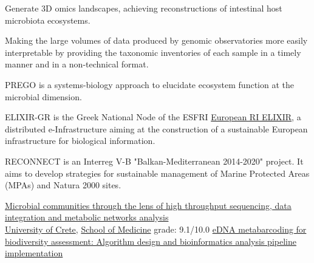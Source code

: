 \documentclass[
    a4paper,
]{fortysecondscv}
\begin{document}
\makefrontsidebar

\begin{cvtable}[3]

    {Generate 3D omics landscapes, achieving reconstructions of intestinal host microbiota ecosystems.}

    {Making the large volumes of data produced by genomic observatories more easily interpretable by providing the taxonomic inventories of each sample in a timely manner and in a non-technical format.}


    {PREGO is a systems-biology approach to elucidate ecosystem function at the microbial dimension.}
    
    {ELIXIR-GR is the Greek National Node of the ESFRI \href{https://elixir-europe.org/}{European RI ELIXIR}, a distributed e-Infrastructure aiming at the construction of a sustainable European infrastructure for biological information.}
    
    {RECONNECT is an Interreg V-B "Balkan-Mediterranean 2014-2020" project. It aims to develop strategies for sustainable management of Marine Protected Areas (MPAs) and Natura 2000 sites.}

\end{cvtable}



\begin{cvtable}[1.5]
        {\href{https://www.openarchives.gr/aggregator-openarchives/edm/elocus/000018-dlib_5_7_d_metadata-dlib-1661248925-407543-18532.tkl?language=en}{Microbial communities through the lens of high throughput sequencing, data integration and metabolic networks analysis}}
    \\
    {\href{https://en.uoc.gr/}{University of Crete}, \href{http://www.english.med.uoc.gr/}{School of Medicine}}
        {grade: 9.1/10.0}
        {\href{https://www.openarchives.gr/aggregator-openarchives/edm/elocus/000018-dlib_5_2_f_metadata-dlib-1545038085-364284-26948.tkl}{eDNA metabarcoding for biodiversity assessment: Algorithm design and bioinformatics analysis pipeline implementation}}

\end{cvtable}
\end{document}
